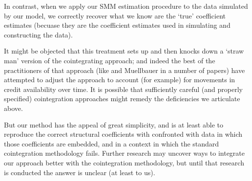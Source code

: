In contrast, when we apply our SMM estimation procedure to the data simulated by our model,
we correctly recover what we know are the `true' coefficient estimates (becuase they are the
coefficient estimates used in simulating and constructing the data).

It might be objected that this treatment sets up and then knocks down
a `straw man' version of the cointegrating approach; and indeed the
best of the practitioners of that approach (like
\cite{ducaEtAl10_creditArch} and Muellbauer in a number of papers)
have attempted to adjust the approach to account (for example) for
movements in credit availability over time.  It is possible that sufficiently
careful (and properly specified) cointegration approaches might remedy
the deficiencies we articulate above.

But our method has the appeal of great simplicity, and is at least able to
reproduce the correct structural coefficients with confronted with data in
which those coefficients are embedded, and in a context in which the standard
cointegration methodology fails.  Further research may uncover ways to integrate
our approach better with the cointegration methodology, but until that research
is conducted the answer is unclear (at least to us).


